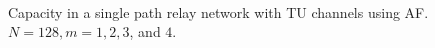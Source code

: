 \begin{figure}
{	 \\
}
\caption{Capacity in a single path relay network with TU channels using AF.  $N = 128, m = 1, 2, 3$, and $4$.}
\label{fig:sp_af_cap_plots_TU}
\end{figure}

